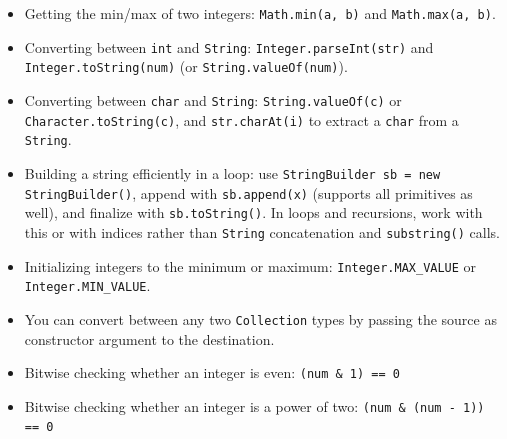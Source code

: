 \documentclass[table, xcdraw]{article}%
\begin{document}
\begin{itemize}
    \item Getting the min/max of two integers: \texttt{Math.min(a, b)} and \texttt{Math.max(a, b)}.
    \item Converting between \texttt{int} and \texttt{String}: \texttt{Integer.parseInt(str)} and \texttt{Integer.toString(num)} (or \texttt{String.valueOf(num)}).
    \item Converting between \texttt{char} and \texttt{String}: \texttt{String.valueOf(c)} or \texttt{Character.toString(c)}, and \texttt{str.charAt(i)} to extract a \texttt{char} from a \texttt{String}.
    \item Building a string efficiently in a loop: use \texttt{StringBuilder sb = new StringBuilder()}, append with \texttt{sb.append(x)} (supports all primitives as well), and finalize with \texttt{sb.toString()}. In loops and recursions, work with this or with indices rather than \texttt{String} concatenation and \texttt{substring()} calls.
    \item Initializing integers to the minimum or maximum: \texttt{Integer.MAX_VALUE} or \texttt{Integer.MIN_VALUE}.
    \item You can convert between any two \texttt{Collection} types by passing the source as constructor argument to the destination.
    \item Bitwise checking whether an integer is even: \texttt{(num & 1) == 0}
    \item Bitwise checking whether an integer is a power of two: \texttt{(num & (num - 1)) == 0}
\end{itemize}
\end{document}
